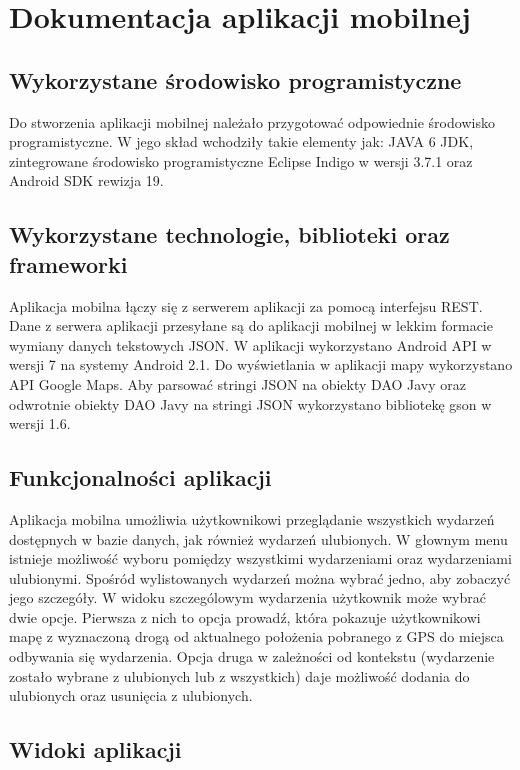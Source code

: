 \documentclass[a4paper]{article}
\begin{document}
\section{Dokumentacja aplikacji mobilnej}

\subsection{Wykorzystane środowisko programistyczne}

Do stworzenia aplikacji mobilnej należało przygotować odpowiednie środowisko programistyczne. W jego skład wchodziły takie elementy jak:
JAVA 6 JDK, zintegrowane środowisko programistyczne Eclipse Indigo w wersji 3.7.1 oraz Android SDK rewizja 19.

\subsection{Wykorzystane technologie, biblioteki oraz frameworki}

Aplikacja mobilna łączy się z serwerem aplikacji za pomocą interfejsu REST. Dane z serwera aplikacji przesyłane są do aplikacji mobilnej w lekkim formacie 
wymiany danych tekstowych JSON. W aplikacji wykorzystano Android API w wersji 7 na systemy Android 2.1. Do wyświetlania w aplikacji mapy wykorzystano 
API Google Maps. Aby parsować stringi JSON na obiekty DAO Javy oraz odwrotnie obiekty DAO Javy na stringi JSON wykorzystano bibliotekę gson w wersji 1.6.

\subsection{Funkcjonalności aplikacji}

Aplikacja mobilna umożliwia użytkownikowi przeglądanie wszystkich wydarzeń dostępnych w bazie danych, jak również wydarzeń ulubionych. W głownym menu istnieje możliwość wyboru pomiędzy wszystkimi wydarzeniami oraz wydarzeniami ulubionymi. Spośród wylistowanych wydarzeń można wybrać jedno, aby zobaczyć jego szczegóły. W widoku szczególowym wydarzenia użytkownik może wybrać dwie opcje. Pierwsza z nich to opcja prowadź, która pokazuje użytkownikowi mapę z wyznaczoną drogą od aktualnego położenia pobranego z GPS do miejsca odbywania się wydarzenia. Opcja druga w zależności od kontekstu (wydarzenie zostało wybrane z ulubionych lub z wszystkich) daje możliwość dodania do ulubionych oraz usunięcia z ulubionych.

\subsection{Widoki aplikacji}
\end{document}
